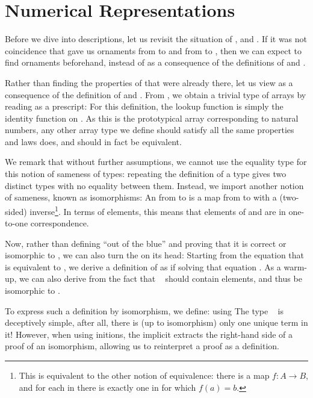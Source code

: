 \section{Numerical Representations}\label{sec:desc-numrep}
Before we dive into descriptions, let us revisit the situation of \bN{},  and . If it was not coincidence that gave us ornaments from \bN{} to  and from  to , then we can expect to find ornaments beforehand, instead of as a consequence of the definitions of  and .

Rather than finding the properties of  that were already there, let us view  as a consequence of the definition of \bN{} and . From \bN{}, we obtain a trivial type of arrays by reading  as a prescript:
For this definition, the lookup function is simply the identity function on . As this is the prototypical array corresponding to natural numbers, any other array type we define should satisfy all the same properties and laws  does, and should in fact be equivalent.


We remark that without further assumptions, we cannot use the equality type  for this notion of sameness of types: repeating the definition of a type gives two distinct types with no equality between them. Instead, we import another notion of sameness, known as isomorphisms:
An  from  to  is a map from  to  with a (two-sided) inverse\footnote{This is equivalent to the other notion of equivalence: there is a map $f : A \to B$, and for each  in  there is exactly one  in  for which $f(a) = b$.}. In terms of elements, this means that elements of  and  are in one-to-one correspondence.

Now, rather than defining  ``out of the blue'' and proving that it is correct or isomorphic to , we can also turn the  on its head: Starting from the equation that  is equivalent to , we derive a definition of  as if solving that equation \cite{calcdata}. As a warm-up, we can also derive  from the fact that \  should contain  elements, and thus be isomorphic to .

To express such a definition by isomorphism, we define:
using
The type \  is deceptively simple, after all, there is (up to isomorphism) only one unique term in it! However, when using initions, the implicit  extracts the right-hand side of a proof of an isomorphism, allowing us to reinterpret a proof as a definition.

